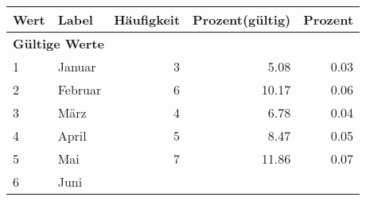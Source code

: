      \begin{longtable}{lXrrr}
     \toprule
     \textbf{Wert} & \textbf{Label} & \textbf{Häufigkeit} & \textbf{Prozent(gültig)} & \textbf{Prozent} \\
     \endhead
     \midrule
     \multicolumn{5}{l}{\textbf{Gültige Werte}}\\

     1 &
     \multicolumn{1}{X}{ Januar   } &


       \num{3} &
       \num[round-mode=places,round-precision=2]{5.08} &
         \num[round-mode=places,round-precision=2]{0.03} \\

     2 &
     \multicolumn{1}{X}{ Februar   } &


       \num{6} &
       \num[round-mode=places,round-precision=2]{10.17} &
         \num[round-mode=places,round-precision=2]{0.06} \\

     3 &
     \multicolumn{1}{X}{ März   } &


       \num{4} &
       \num[round-mode=places,round-precision=2]{6.78} &
         \num[round-mode=places,round-precision=2]{0.04} \\

     4 &
     \multicolumn{1}{X}{ April   } &


       \num{5} &
       \num[round-mode=places,round-precision=2]{8.47} &
         \num[round-mode=places,round-precision=2]{0.05} \\

     5 &
     \multicolumn{1}{X}{ Mai   } &


       \num{7} &
       \num[round-mode=places,round-precision=2]{11.86} &
         \num[round-mode=places,round-precision=2]{0.07} \\

     6 &
     \multicolumn{1}{X}{ Juni   } &



\end{longtable}
